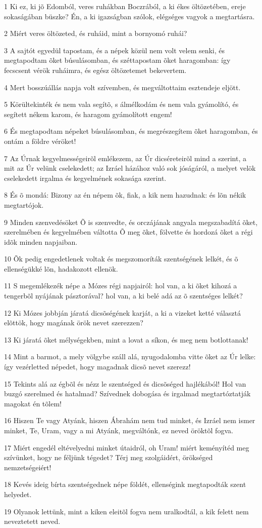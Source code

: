 \par 1 Ki ez, ki jõ Edomból, veres ruhákban Boczrából, a ki ékes öltözetében, ereje sokaságában büszke? Én, a ki igazságban szólok, elégséges vagyok a megtartásra.
\par 2 Miért veres öltözeted, és ruháid, mint a bornyomó ruhái?
\par 3 A sajtót egyedül tapostam, és a népek közül nem volt velem senki, és megtapodtam õket búsulásomban, és széttapostam õket haragomban: így fecscsent vérök ruháimra, és egész öltözetemet bekevertem.
\par 4 Mert bosszúállás napja volt szívemben, és megváltottaim esztendeje eljött.
\par 5 Körültekinték és nem vala segítõ, s álmélkodám és nem vala gyámolító, és segített nékem karom, és haragom gyámolított engem!
\par 6 És megtapodtam népeket búsulásomban, és megrészegítem õket haragomban, és ontám a földre véröket!
\par 7 Az Úrnak kegyelmességeirõl emlékezem, az Úr dicséreteirõl mind a szerint, a mit az Úr velünk cselekedett; az Izráel házához való sok jóságáról, a melyet velök cselekedett irgalma és kegyelmének sokasága szerint.
\par 8 És õ mondá: Bizony az én népem õk, fiak, a kik nem hazudnak: és lõn nékik megtartójok.
\par 9 Minden szenvedésöket Õ is szenvedte, és orczájának angyala megszabadítá õket, szerelmében és kegyelmében váltotta Õ meg õket, fölvette és hordozá õket a régi idõk minden napjaiban.
\par 10 Õk pedig engedetlenek voltak és megszomoríták szentségének lelkét, és õ ellenségükké lõn, hadakozott ellenök.
\par 11 S megemlékezék népe a Mózes régi napjairól: hol van, a ki õket kihozá a tengerbõl nyájának pásztorával? hol van, a ki belé adá az õ szentséges lelkét?
\par 12 Ki Mózes jobbján járatá dicsõségének karját, a ki a vizeket ketté választá elõttök, hogy magának örök nevet szerezzen?
\par 13 Ki járatá õket mélységekben, mint a lovat a síkon, és meg nem botlottanak!
\par 14 Mint a barmot, a mely völgybe száll alá, nyugodalomba vitte õket az Úr lelke: így vezérletted népedet, hogy magadnak dicsõ nevet szerezz!
\par 15 Tekints alá az égbõl és nézz le szentséged és dicsõséged hajlékából! Hol van buzgó szerelmed és hatalmad? Szívednek dobogása és irgalmad megtartóztatják magokat én tõlem!
\par 16 Hiszen Te vagy Atyánk, hiszen Ábrahám nem tud minket, és Izráel nem ismer minket, Te, Uram, vagy a mi Atyánk, megváltónk, ez neved öröktõl fogva.
\par 17 Miért engedél eltévelyedni minket útaidról, oh Uram! miért keményítéd meg szívünket, hogy ne féljünk tégedet? Térj meg szolgáidért, örökséged nemzetségeiért!
\par 18 Kevés ideig bírta szentségednek népe földét, ellenségink megtapodták szent helyedet.
\par 19 Olyanok lettünk, mint a kiken eleitõl fogva nem uralkodtál, a kik felett nem neveztetett neved.

